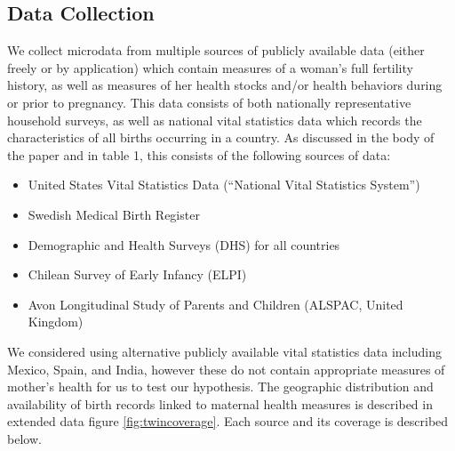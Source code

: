 \documentclass{nature}
\begin{document}
\begin{linenumbers}
\subsection{Data Collection}
We collect microdata from multiple sources of publicly available data (either freely or by application) which contain measures of a woman's full fertility history, as well as measures of her health stocks and/or health behaviors during or prior to pregnancy.  This data consists of both nationally representative household surveys, as well as national vital statistics data which records the characteristics of all births occurring in a country.  As discussed in the body of the paper and in table 1, this consists of the following sources of data:
\begin{itemize}
\item United States Vital Statistics Data (``National Vital Statistics System'')
\item Swedish Medical Birth Register
\item Demographic and Health Surveys (DHS) for all countries
\item Chilean Survey of Early Infancy (ELPI)
\item Avon Longitudinal Study of Parents and Children (ALSPAC, United Kingdom)
\end{itemize}
We considered using alternative publicly available vital statistics data including Mexico, Spain, and India, however these do not contain appropriate measures of mother's health for us to test our hypothesis.  The geographic distribution and availability of birth records linked to maternal health measures is described in extended data figure \ref{fig:twincoverage}.  Each source and its coverage is described below.


\end{linenumbers}
\end{document}
